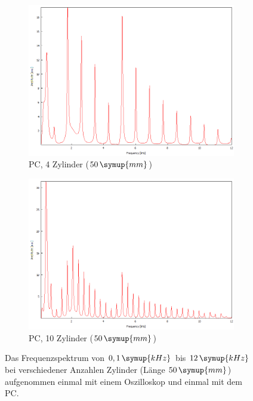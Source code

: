 \begin{figure}
\begin{subfigure}[b]{0.3\textwidth}
        \includegraphics[width=\textwidth]{data/1_2zylinder50mmPC/4.png}
        \caption{PC, 4 Zylinder ($50 \, \symup{mm}$)}
    \end{subfigure}
    \hfill
    \begin{subfigure}[b]{0.3\textwidth}
        \centering
        \includegraphics[width=\textwidth]{data/1_2zylinder50mmPC/10.png}
        \caption{PC, 10 Zylinder ($50 \, \symup{mm}$)}
    \end{subfigure}
       \caption{Das Frequenzspektrum von $0,1 \, \symup{kHz}$ bis $12 \, \symup{kHz}$ bei verschiedener Anzahlen Zylinder (Länge $50 \, \symup{mm}$) aufgenommen einmal mit einem Oszilloskop und einmal mit dem PC.}
       \label{fig:blub1}
\end{figure}

